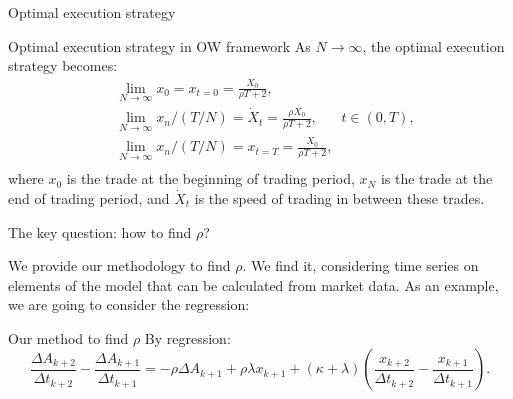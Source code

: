 \documentclass[]{beamer}
\begin{document}
\begin{frame}[t]
\begin{columns}[t]
\begin{column}{\onecolwid}
    \begin{block}{Optimal execution strategy }
    
    
    \begin{alertblock}{Optimal execution strategy in OW framework}
        As $N \rightarrow \infty$, the optimal execution strategy becomes:
        \begin{align*}
            & \lim _{N \rightarrow \infty} x_0 = x_{t = 0} = \frac{X_0}{\rho T + 2}, \\
            & \lim _{N \rightarrow \infty} x_n / (T/N) = \dot X _t = \frac{\rho X_0}{\rho T + 2}, \;\;\;\;\;\; t \in (0, T), \\
            & \lim _{N \rightarrow \infty} x_n / (T/N) = x_{t=T}=  \frac{X_0}{\rho T + 2},  \\
        \end{align*}
        where $x_0$ is the trade at the beginning of trading period, $x_N$ is the trade at the end of trading
        period, and $\dot X _t$ is the speed of trading in between these trades.
    \end{alertblock}
    \end{block}

    \begin{block}{The key question: how to find $\rho$?}
        
        We provide our methodology to find $\rho$. We find it, considering time series on elements of the model 
        that can be calculated from market data. As an example, we are going to consider the regression:
        \begin{alertblock}{Our method to find $\rho$}
            By regression:
            \begin{equation*}
                \frac{\Delta A_{k+2}}{\Delta t_{k+2}} - \frac{\Delta A_{k+1}}{\Delta t_{k+1}} 
        = - \rho \Delta A_{k+1} + \rho \lambda x_{k+1} + (\kappa + \lambda) (\frac{x_{k+2}}{\Delta t_{k+2}} - \frac{x_{k+1}}{\Delta t_{k+1}}).
            \end{equation*}
        \end{alertblock}
    \end{block}

   
    
    \end{column}
    

\end{columns}
\end{frame}
\end{document}
